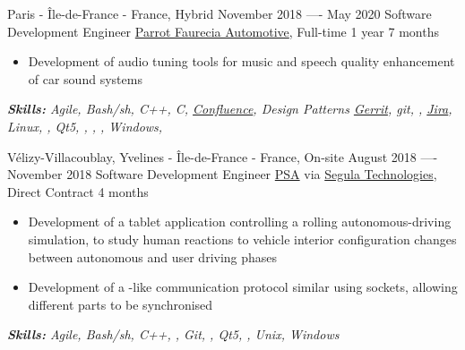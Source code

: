 \documentclass[11pt,a4paper,roman]{moderncv}
\begin{document}
\cventry
{Paris - Île-de-France - France, Hybrid}
{November 2018 —- May 2020}
{Software Development Engineer}
{\href{https://www.faurecia-clarion.com}{Parrot Faurecia Automotive}, Full-time}
{1 year 7 months}
{}
{
\begin{itemize}
\item Development of audio tuning tools for music and speech quality enhancement of car sound systems
\end{itemize}
{\textcolor{color2}{\textit{\textbf{Skills:}
	Agile,
	Bash/sh,
	C++,
	C,
	\href{https://www.atlassian.com/software/confluence}{Confluence},
	Design Patterns
	\href{https://www.gerritcodereview.com}{Gerrit},
	git,
	,
	\href{https://www.atlassian.com/software/jira}{Jira},
	Linux,
	,
	Qt5,
	,
   ,
   ,
	Windows,
	\newline
}}}}

\cventry
{Vélizy-Villacoublay, Yvelines - Île-de-France - France, On-site}
{August 2018 —- November 2018}
{Software Development Engineer}
{\href{https://www.groupe-psa.com/en/}{PSA} via \href{https://www.segulatechnologies.com/en/}{Segula Technologies}, Direct Contract}
{4 months}
{}
{
\begin{itemize}
	\item Development of a tablet application controlling a rolling autonomous-driving simulation, to study human reactions to vehicle interior configuration changes between autonomous and user driving phases
	\item Development of a -like communication protocol similar using  sockets, allowing different  parts to be synchronised
\end{itemize}
{\textcolor{color2}{\textit{\textbf{Skills:}
	Agile,
	Bash/sh,
	C++,
	,
	Git,
	,
	Qt5,
	,
	Unix,
	Windows
	\newline
}}}}
\end{document}
